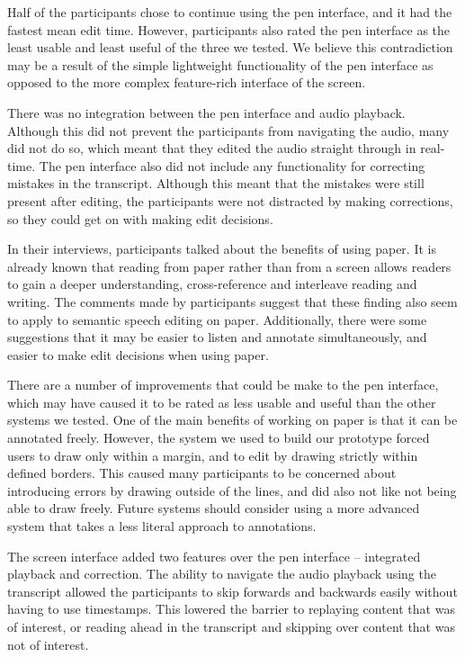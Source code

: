 Half of the participants chose to continue using the pen interface, and it had the fastest mean edit time. However,
participants also rated the pen interface as the least usable and least useful of the three we tested. We believe this
contradiction may be a result of the simple lightweight functionality of the pen interface as opposed to the
more complex feature-rich interface of the screen.

There was no integration between the pen interface and audio playback. Although this did not prevent the participants
from navigating the audio, many did not do so, which meant that they edited the audio straight through in real-time. 
The pen interface also did not include any functionality for correcting mistakes in the transcript. Although this meant
that the mistakes were still present after editing, the participants were not distracted by making corrections, so they
could get on with making edit decisions.

In their interviews, participants talked about the benefits of using paper. It is already known that reading from paper
rather than from a screen allows readers to gain a deeper understanding, cross-reference and interleave reading and
writing.  The comments made by participants suggest that these finding also seem to apply to semantic speech editing on
paper. Additionally, there were some suggestions that it may be easier to listen and annotate simultaneously, and
easier to make edit decisions when using paper.

There are a number of improvements that could be make to the pen interface, which may have caused it to be rated as
less usable and useful than the other systems we tested. One of the main benefits of working on
paper is that it can be annotated freely. However, the system we used to build our prototype forced users to draw only
within a margin, and to edit by drawing strictly within defined borders. This caused many participants to be concerned
about introducing errors by drawing outside of the lines, and did also not like not being able to draw freely.
Future systems should consider using a more advanced system that takes a less literal approach to annotations.

The screen interface added two features over the pen interface -- integrated playback and correction. The ability to
navigate the audio playback using the transcript allowed the participants to skip forwards and backwards easily
without having to use timestamps. This lowered the barrier to replaying content that was of interest, or reading ahead
in the transcript and skipping over content that was not of interest.

